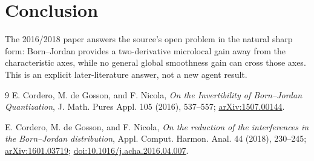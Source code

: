 \documentclass[11pt]{article}
\begin{document}
\section*{Conclusion}
The 2016/2018 paper answers the source's open problem in the natural sharp
form: Born--Jordan provides a two-derivative microlocal gain away from the
characteristic axes, while no general global smoothness gain can cross those
axes.  This is an explicit later-literature answer, not a new agent result.

\begin{thebibliography}{9}
E. Cordero, M. de Gosson, and F. Nicola,
\emph{On the Invertibility of Born--Jordan Quantization},
J. Math. Pures Appl. 105 (2016), 537--557;
\href{https://arxiv.org/abs/1507.00144}{arXiv:1507.00144}.

E. Cordero, M. de Gosson, and F. Nicola,
\emph{On the reduction of the interferences in the Born--Jordan distribution},
Appl. Comput. Harmon. Anal. 44 (2018), 230--245;
\href{https://arxiv.org/abs/1601.03719}{arXiv:1601.03719};
\href{https://doi.org/10.1016/j.acha.2016.04.007}{doi:10.1016/j.acha.2016.04.007}.
\end{thebibliography}
\end{document}
